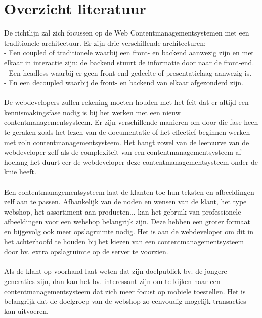 
\section{Overzicht literatuur}%
\label{sec:overzicht-literatuur}

De richtlijn zal zich focussen op de Web Contentmanagementsystemen met een traditionele architectuur. Er zijn drie verschillende architecturen: \autocite{Meshen2021}\\
- Een coupled of traditionele waarbij een front- en backend aanwezig zijn en met elkaar in interactie zijn: de backend stuurt de informatie door naar de front-end.\\
- Een headless waarbij er geen front-end gedeelte of presentatielaag aanwezig is.\\  
- En een decoupled waarbij de front- en backend van elkaar afgezonderd zijn.
\\\\
De webdevelopers zullen rekening moeten houden met het feit dat er altijd een kennismakingsfase nodig is bij het werken met een nieuw contentmanagementsysteem. Er zijn verschillende manieren om door die fase heen te geraken zoals het lezen van de documentatie of het effectief beginnen werken met zo'n contentmanagementsysteem. Het hangt zowel van de leercurve van de webdeveloper zelf als de complexiteit van een contentmanagementsysteem af hoelang het duurt eer de webdeveloper deze contentmanagementsysteem onder de knie heeft. \autocite{DriesBlanchaert2022}    
\\\\
Een contentmanagementsysteem laat de klanten toe hun teksten en afbeeldingen zelf aan te passen. Afhankelijk van de noden en wensen van de klant, het type webshop, het assortiment aan producten... kan het gebruik van professionele afbeeldingen voor een webshop belangrijk zijn. Deze hebben een groter formaat en bijgevolg ook meer opslagruimte nodig. Het is aan de webdeveloper om dit in het achterhoofd te houden bij het kiezen van een contentmanagementsysteem door bv. extra opslagruimte op de server te voorzien.  \autocite{LatumenRonaldDekker2004} 
\\\\
Als de klant op voorhand laat weten dat zijn doelpubliek bv. de jongere generaties zijn, dan kan het bv. interessant zijn om te kijken naar een contentmanagementsysteem dat zich meer focust op mobiele toestellen. Het is belangrijk dat de doelgroep van de webshop zo eenvoudig mogelijk transacties kan uitvoeren. \autocite{Tahir2011}
